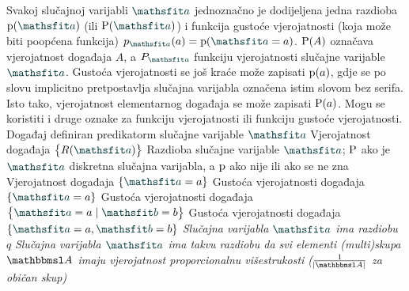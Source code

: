 {Svakoj slučajnoj varijabli $\rvar a$ jednoznačno je dodijeljena jedna razdioba $\p(\rvar a)$ (ili $\P(\rvar a)$) i funkcija gustoće vjerojatnosti (koja može biti poopćena funkcija) $p_{\rvar a}(a)=\p(\rvar a=a)$. $\P(A)$ označava vjerojatnost događaja $A$, a $P_{\rvar a}$ funkciju vjerojatnosti slučajne varijable $\rvar a$. Gustoća vjerojatnosti se još kraće može zapisati $\p(a)$, gdje se po slovu implicitno pretpostavlja slučajna varijabla označena istim slovom bez serifa. Isto tako, vjerojatnost elementarnog događaja se može zapisati $\P(a)$. Mogu se koristiti i druge oznake za funkciju vjerojatnosti ili funkciju gustoće vjerojatnosti.}
 {Događaj definiran predikatorm slučajne varijable $\rvar a$}
 {Vjerojatnost događaja $\cbr{R(\rvar a)}$}
 {Razdioba slučajne varijable $\rvar a$; $\P$ ako je $\rvar a$ diskretna slučajna varijabla, a $\p$ ako nije ili ako se ne zna}
 {Vjerojatnost događaja $\cbr{\rvar a=a}$}
 {Gustoća vjerojatnosti događaja $\cbr{\rvar a=a}$}
 {Gustoća vjerojatnosti događaja $\cbr{\rvar a=a\mid\rvar b=b}$}
 {Gustoća vjerojatnosti događaja $\cbr{\rvar a=a,\rvar b=b}$}
 {\textit{Slučajna varijabla $\rvar a$ ima razdiobu $q$}}
 	{\textit{Slučajna varijabla $\rvar a$ ima takvu razdiobu da svi elementi (multi)skupa $\set A$ imaju vjerojatnost proporcionalnu višestrukosti ($\frac{1}{\envert{\set A}}$ za običan skup)}}
